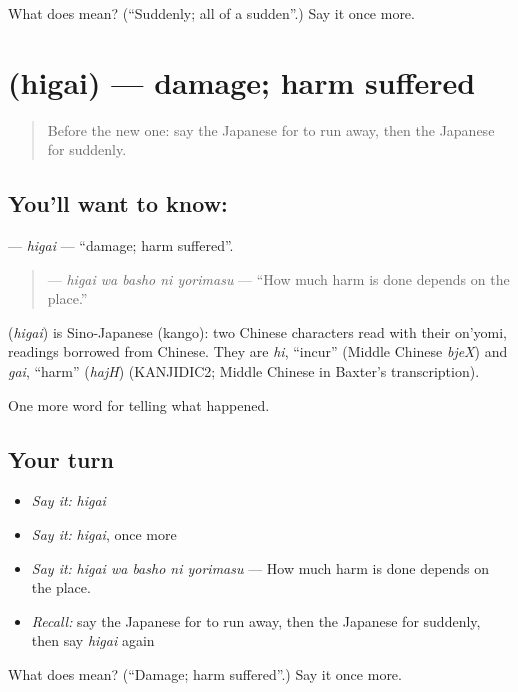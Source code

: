 \begin{tcolorbox}[breakable,colback=teal!4,colframe=teal!35!black,title={Before you move on}]
What does  mean? (\textquotedblleft{}Suddenly; all of a sudden\textquotedblright{}.) Say it once more.
\end{tcolorbox}
\section[\texorpdfstring{\ja{ひがい} (higai)}{ひがい (higai)}]{ (higai) — damage; harm suffered}

\label{lesson:JA-C262-higai}



\begin{quote}
Before the new one: say the Japanese for to run away, then the Japanese for suddenly.
\end{quote}

\subsection*{You'll want to know: }
\textbf{} — \emph{higai} — \textquotedblleft{}damage; harm suffered\textquotedblright{}.

\begin{quote}
\textbf{  } — \emph{higai wa basho ni yorimasu} — \textquotedblleft{}How much harm is done depends on the place.\textquotedblright{}
\end{quote}

\begin{cousinweb}
\textbf{} (\emph{higai}) is Sino-Japanese (kango): two Chinese characters read with their on'yomi, readings borrowed from Chinese. They are \emph{hi}, \textquotedblleft{}incur\textquotedblright{} (Middle Chinese \emph{bjeX}) and \emph{gai}, \textquotedblleft{}harm\textquotedblright{} (\emph{hajH}) (KANJIDIC2; Middle Chinese in Baxter's transcription).
\end{cousinweb}

\begin{grammarlens}[title={What you've built}]
One more word for telling what happened.
\end{grammarlens}

\subsection*{Your turn}
\begin{itemize}
\raggedright
  \item \emph{Say it:} \emph{higai}
  \item \emph{Say it:} \emph{higai}, once more
  \item \emph{Say it:} \emph{higai wa basho ni yorimasu} — How much harm is done depends on the place.
  \item \emph{Recall:} say the Japanese for to run away, then the Japanese for suddenly, then say \emph{higai} again
\end{itemize}

\begin{tcolorbox}[breakable,colback=teal!4,colframe=teal!35!black,title={Before you move on}]
What does  mean? (\textquotedblleft{}Damage; harm suffered\textquotedblright{}.) Say it once more.
\end{tcolorbox}
